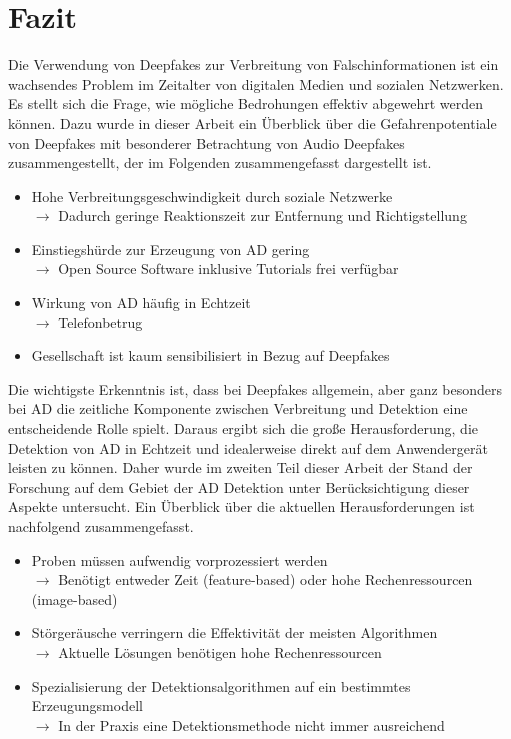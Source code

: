 \section{Fazit}
Die Verwendung von Deepfakes zur Verbreitung von Falschinformationen ist ein wachsendes Problem im Zeitalter von digitalen Medien und sozialen Netzwerken.
Es stellt sich die Frage, wie mögliche Bedrohungen effektiv abgewehrt werden können.
Dazu wurde in dieser Arbeit ein Überblick über die Gefahrenpotentiale von Deepfakes mit besonderer Betrachtung von Audio Deepfakes zusammengestellt, der im Folgenden zusammengefasst dargestellt ist.

\begin{itemize}
  \item Hohe Verbreitungsgeschwindigkeit durch soziale Netzwerke\\
  		$\rightarrow$ Dadurch geringe Reaktionszeit zur Entfernung und Richtigstellung
  \item Einstiegshürde zur Erzeugung von AD gering\\
        $\rightarrow$ Open Source Software inklusive Tutorials frei verfügbar
  \item Wirkung von AD häufig in Echtzeit\\
        $\rightarrow$ Telefonbetrug
  \item Gesellschaft ist kaum sensibilisiert in Bezug auf Deepfakes
\end{itemize}

Die wichtigste Erkenntnis ist, dass bei Deepfakes allgemein, aber ganz besonders bei AD die zeitliche Komponente zwischen Verbreitung und Detektion eine entscheidende Rolle spielt.
Daraus ergibt sich die große Herausforderung, die Detektion von AD in Echtzeit und idealerweise direkt auf dem Anwendergerät leisten zu können.
Daher wurde im zweiten Teil dieser Arbeit der Stand der Forschung auf dem Gebiet der AD Detektion unter Berücksichtigung dieser Aspekte untersucht.
Ein Überblick über die aktuellen Herausforderungen ist nachfolgend zusammengefasst.

\begin{itemize}
  \item Proben müssen aufwendig vorprozessiert werden\\
        $\rightarrow$ Benötigt entweder Zeit (feature-based) oder hohe Rechenressourcen (image-based)
  \item Störgeräusche verringern die Effektivität der meisten Algorithmen\\
        $\rightarrow$ Aktuelle Lösungen benötigen hohe Rechenressourcen
  \item Spezialisierung der Detektionsalgorithmen auf ein bestimmtes Erzeugungsmodell\\
        $\rightarrow$ In der Praxis eine Detektionsmethode nicht immer ausreichend 
\end{itemize}

